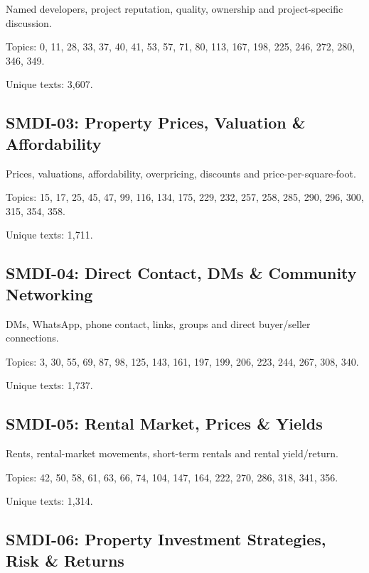 \documentclass[10pt]{article}
\begin{document}
Named developers, project reputation, quality, ownership and project-specific discussion.

\par Topics: 0, 11, 28, 33, 37, 40, 41, 53, 57, 71, 80, 113, 167, 198, 225, 246, 272, 280, 346, 349.

\par Unique texts: 3,607.

\subsection*{SMDI-03: Property Prices, Valuation \& Affordability}

Prices, valuations, affordability, overpricing, discounts and price-per-square-foot.

\par Topics: 15, 17, 25, 45, 47, 99, 116, 134, 175, 229, 232, 257, 258, 285, 290, 296, 300, 315, 354, 358.

\par Unique texts: 1,711.

\subsection*{SMDI-04: Direct Contact, DMs \& Community Networking}

DMs, WhatsApp, phone contact, links, groups and direct buyer/seller connections.

\par Topics: 3, 30, 55, 69, 87, 98, 125, 143, 161, 197, 199, 206, 223, 244, 267, 308, 340.

\par Unique texts: 1,737.

\subsection*{SMDI-05: Rental Market, Prices \& Yields}

Rents, rental-market movements, short-term rentals and rental yield/return.

\par Topics: 42, 50, 58, 61, 63, 66, 74, 104, 147, 164, 222, 270, 286, 318, 341, 356.

\par Unique texts: 1,314.

\subsection*{SMDI-06: Property Investment Strategies, Risk \& Returns}
\end{document}
